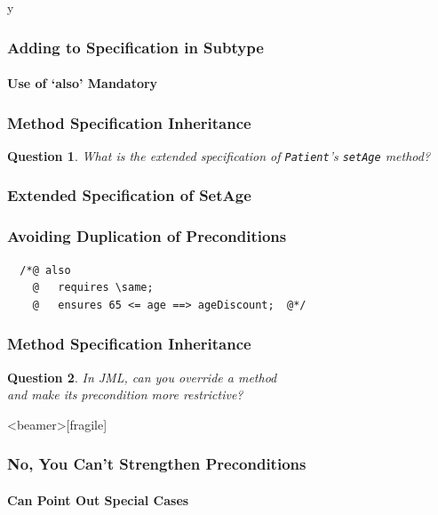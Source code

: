 \if y\MAKEHANDOUTS \documentclass[t,compress,landscape,handout]{beamer}
\newtheorem*{question}{Question}
\begin{document}
\begin{frame}[fragile]
\frametitle{Adding to Specification in Subtype}
\framesubtitle{Use of `also' Mandatory}


\end{frame}

\begin{frame}
\frametitle{Method Specification Inheritance}

\begin{question}
What is the extended specification of \texttt{Patient}'s
\texttt{setAge} method?
\end{question}
\end{frame}

\begin{frame}[fragile]
\frametitle{Extended Specification of SetAge}


\end{frame}

\begin{frame}[fragile]
\frametitle{Avoiding Duplication of Preconditions}

\begin{lstlisting}
  /*@ also
    @   requires \same;
    @   ensures 65 <= age ==> ageDiscount;  @*/
\end{lstlisting}
\end{frame}

\begin{frame}
\frametitle{Method Specification Inheritance}
\begin{question}
In JML, can you override a method \\
and make its precondition more restrictive?
\end{question}
\end{frame}

\begin{frame}<beamer>[fragile]
\frametitle{No, You Can't Strengthen Preconditions}
\framesubtitle{Can Point Out Special Cases}



\end{frame}
\end{document}
